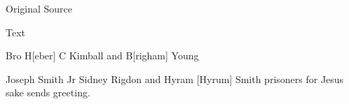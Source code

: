 			
			\begin{description}
				\item[Original Source]
			\end{description}
			
			
			\begin{description}
				\item[Text]
			\end{description}
			

				Bro H[eber] C Kimball and B[righam] Young

				Joseph Smith Jr Sidney Rigdon and Hyram [Hyrum] Smith prisoners for Jesus sake sends greeting.

